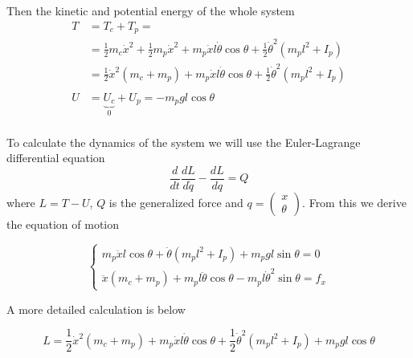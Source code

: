 \documentclass[unicode]{article}
\newcommand{\pmat}[1]{\begin{pmatrix}#1\end{pmatrix}}
\begin{document}
Then the kinetic and potential energy of the whole system
\begin{align*}
    T & = T_c + T_p =                                                                                                                                               \\
      & = \frac{1}{2} m_c \dot{x}^2 + \frac{1}{2} m_p \dot{x}^2 + m_p \dot{x} l \dot{\theta} \cos \theta + \frac{1}{2} \dot{\theta}^2 \left( m_p l^2  + I_p \right) \\
      & = \frac{1}{2} \dot{x}^2 (m_c + m_p) + m_p \dot{x} l \dot{\theta} \cos \theta + \frac{1}{2} \dot{\theta}^2 \left( m_p l^2  + I_p \right)                     \\
      &                                                                                                                                                             \\
    U & = \underbrace{U_c}_{0} + U_p = -m_p gl \cos \theta                                                                                                          \\
\end{align*}

To calculate the dynamics of the system we will use the Euler-Lagrange differential equation
\[
    \frac{d}{dt} \frac{dL}{d\dot{q}} - \frac{dL}{dq} = Q
\]
where \( L = T - U \), \(Q\) is the generalized force and \(q = \pmat{x \\ \theta}\). From this we derive the equation of motion

\[
    \begin{cases}
        m_p \ddot{x} l \cos \theta + \ddot{\theta} \left(m_p l^2 + I_p\right) + m_p g l \sin \theta = 0  \\
        \ddot{x}(m_c + m_p) + m_p l \ddot{\theta} \cos \theta - m_p l \dot{\theta}^2 \sin \theta = f_{x}
    \end{cases}
\]

A more detailed calculation is below

\[
    L = \frac{1}{2} \dot{x}^2 (m_c + m_p) + m_p \dot{x} l \dot{\theta} \cos \theta + \frac{1}{2} \dot{\theta}^2 \left( m_p l^2  + I_p \right) + m_p gl \cos \theta
\]
\end{document}
